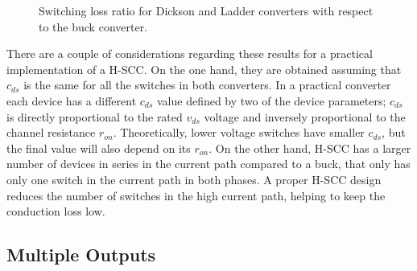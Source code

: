 \begin{SCfigure}
\centering
{}
\caption{Switching loss ratio for Dickson and Ladder converters with respect to the buck converter.}
\label{fig:psw_ratio}
\end{SCfigure}

There are a couple of considerations regarding these results for a practical implementation of a H-SCC. On the one hand, they are obtained assuming that $c_{ds}$ is the same for all the switches in both converters. In a practical converter each device has a different $c_{ds}$ value defined by two of the device parameters; $c_{ds}$ is directly proportional to the rated $v_{ds}$  voltage and inversely proportional to the channel resistance $r_{on}$. Theoretically, lower voltage switches have smaller $c_{ds}$, but the final value will also depend on its $r_{on}$. On the other hand, H-SCC has a larger number of devices in series in the current path compared to a buck, that only has only one switch in the current path in both phases. A proper H-SCC design reduces the number of switches in the high current path, helping to keep the conduction loss low. %



\subsection{Multiple Outputs}

